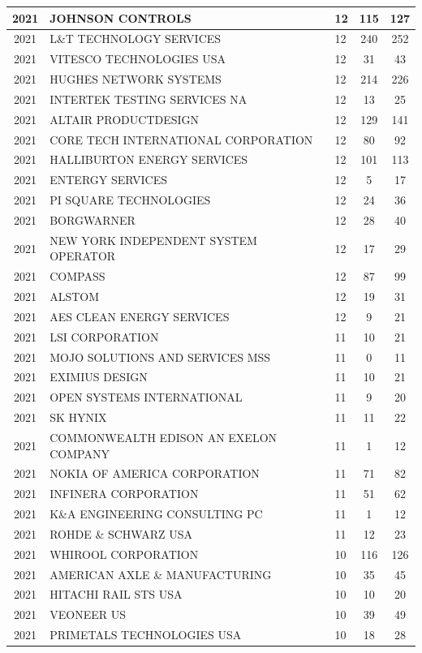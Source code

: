 \documentclass{article}%
\begin{document}
\begin{longtable}{c|p{20em}|p{5em}|c|c}
\hline%
2021&JOHNSON CONTROLS&12&115&127\\%
\hline%
2021&L\&T TECHNOLOGY SERVICES&12&240&252\\%
\hline%
2021&VITESCO TECHNOLOGIES USA&12&31&43\\%
\hline%
2021&HUGHES NETWORK SYSTEMS&12&214&226\\%
\hline%
2021&INTERTEK TESTING SERVICES NA&12&13&25\\%
\hline%
2021&ALTAIR PRODUCTDESIGN&12&129&141\\%
\hline%
2021&CORE TECH INTERNATIONAL CORPORATION&12&80&92\\%
\hline%
2021&HALLIBURTON ENERGY SERVICES&12&101&113\\%
\hline%
2021&ENTERGY SERVICES&12&5&17\\%
\hline%
2021&PI SQUARE TECHNOLOGIES&12&24&36\\%
\hline%
2021&BORGWARNER&12&28&40\\%
\hline%
2021&NEW YORK INDEPENDENT SYSTEM OPERATOR&12&17&29\\%
\hline%
2021&COMPASS&12&87&99\\%
\hline%
2021&ALSTOM&12&19&31\\%
\hline%
2021&AES CLEAN ENERGY SERVICES&12&9&21\\%
\hline%
2021&LSI CORPORATION&11&10&21\\%
\hline%
2021&MOJO SOLUTIONS AND SERVICES MSS&11&0&11\\%
\hline%
2021&EXIMIUS DESIGN&11&10&21\\%
\hline%
2021&OPEN SYSTEMS INTERNATIONAL&11&9&20\\%
\hline%
2021&SK HYNIX&11&11&22\\%
\hline%
2021&COMMONWEALTH EDISON AN EXELON COMPANY&11&1&12\\%
\hline%
2021&NOKIA OF AMERICA CORPORATION&11&71&82\\%
\hline%
2021&INFINERA CORPORATION&11&51&62\\%
\hline%
2021&K\&A ENGINEERING CONSULTING PC&11&1&12\\%
\hline%
2021&ROHDE \& SCHWARZ USA&11&12&23\\%
\hline%
2021&WHIROOL CORPORATION&10&116&126\\%
\hline%
2021&AMERICAN AXLE \& MANUFACTURING&10&35&45\\%
\hline%
2021&HITACHI RAIL STS USA&10&10&20\\%
\hline%
2021&VEONEER US&10&39&49\\%
\hline%
2021&PRIMETALS TECHNOLOGIES USA&10&18&28\\%

\end{longtable}
\end{document}
